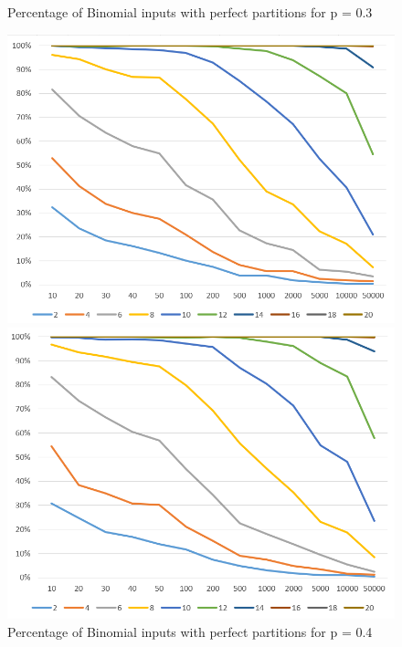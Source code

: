 \begin{figure}[h]
\begin{minipage}[b]{0.45\textwidth}
      \end{minipage}
\end{figure}


\begin{figure}[h]
      \centering
      \begin{minipage}[b]{0.45\textwidth}
            \caption{Percentage of Binomial inputs with perfect partitions for p = 0.3}
            \includegraphics[width=\textwidth]{figures/images/solvabilityOfInputs/solvability0_3.png}
      \end{minipage}
      \hspace{0.75cm}
      \begin{minipage}[b]{0.45\textwidth}
            \caption{Percentage of Binomial inputs with perfect partitions for p = 0.4}
            \includegraphics[width=\textwidth]{figures/images/solvabilityOfInputs/solvability0_4.png}
      \end{minipage}
\end{figure}



